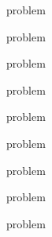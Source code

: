 \documentclass[11pt,a4paper,oneside,final]{article}
\begin{document}
{problem}

{problem}

{problem}

{problem}

{problem}


{problem}


{problem}

{problem}

{problem}
\end{document}
